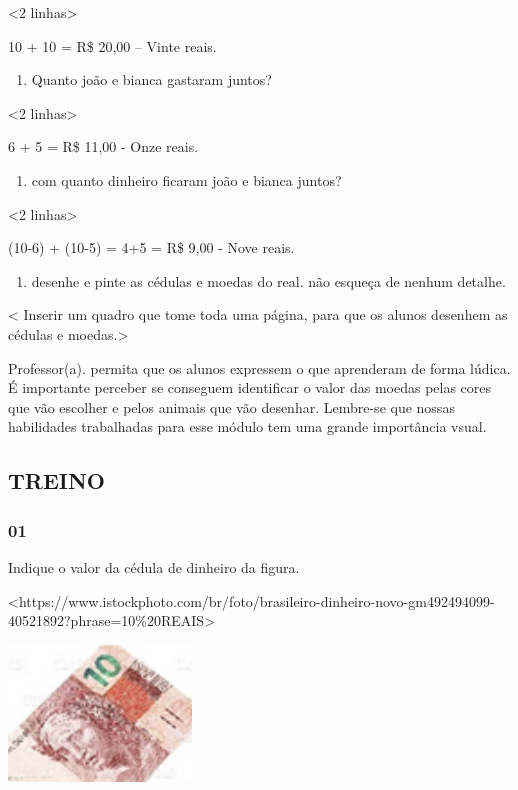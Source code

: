 \textless{}2 linhas\textgreater{}

10 + 10 = R\$ 20,00 -- Vinte reais.

\begin{enumerate}
\def\labelenumi{\Alph{enumi})}
\item
  Quanto joão e bianca gastaram juntos?
\end{enumerate}

\textless{}2 linhas\textgreater{}

6 + 5 = R\$ 11,00 - Onze reais.

\begin{enumerate}
\def\labelenumi{\Alph{enumi})}
\item
  com quanto dinheiro ficaram joão e bianca juntos?
\end{enumerate}

\textless{}2 linhas\textgreater{}

(10-6) + (10-5) = 4+5 = R\$ 9,00 - Nove reais.

\begin{enumerate}
\def\labelenumi{\arabic{enumi}.}
\item
  desenhe e pinte as cédulas e moedas do real. não esqueça de nenhum
  detalhe.
\end{enumerate}

\textless{} Inserir um quadro que tome toda uma página, para que os
alunos desenhem as cédulas e moedas.\textgreater{}

Professor(a). permita que os alunos expressem o que aprenderam de forma
lúdica. É importante perceber se conseguem identificar o valor das
moedas pelas cores que vão escolher e pelos animais que vão desenhar.
Lembre-se que nossas habilidades trabalhadas para esse módulo tem uma
grande importância vsual.

\subsection{TREINO}\label{treino-4}

\subsubsection{01}\label{section-60}

Indique o valor da cédula de dinheiro da figura.

\textless{}https://www.istockphoto.com/br/foto/brasileiro-dinheiro-novo-gm492494099-40521892?phrase=10\%20REAIS\textgreater{}

\includegraphics[width=1.92157in,height=1.43284in]{media/image75.png}

